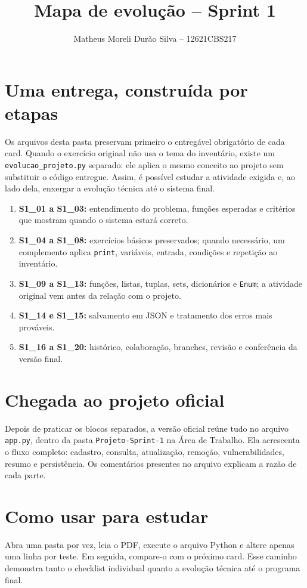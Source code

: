 \documentclass[11pt,a4paper]{article}
\title{Mapa de evolução -- Sprint 1}
\author{Matheus Moreli Durão Silva -- 12621CBS217}
\date{}
\begin{document}
\maketitle
\section*{Uma entrega, construída por etapas}
Os arquivos desta pasta preservam primeiro o entregável obrigatório de cada card. Quando o exercício original não usa o tema do inventário, existe um \texttt{evolucao\_projeto.py} separado: ele aplica o mesmo conceito ao projeto sem substituir o código entregue. Assim, é possível estudar a atividade exigida e, ao lado dela, enxergar a evolução técnica até o sistema final.

\begin{enumerate}
\item \textbf{S1\_01 a S1\_03:} entendimento do problema, funções esperadas e critérios que mostram quando o sistema estará correto.
\item \textbf{S1\_04 a S1\_08:} exercícios básicos preservados; quando necessário, um complemento aplica \texttt{print}, variáveis, entrada, condições e repetição ao inventário.
\item \textbf{S1\_09 a S1\_13:} funções, listas, tuplas, sets, dicionários e \texttt{Enum}; a atividade original vem antes da relação com o projeto.
\item \textbf{S1\_14 e S1\_15:} salvamento em JSON e tratamento dos erros mais prováveis.
\item \textbf{S1\_16 a S1\_20:} histórico, colaboração, branches, revisão e conferência da versão final.
\end{enumerate}

\section*{Chegada ao projeto oficial}
Depois de praticar os blocos separados, a versão oficial reúne tudo no arquivo \texttt{app.py}, dentro da pasta \texttt{Projeto-Sprint-1} na Área de Trabalho. Ela acrescenta o fluxo completo: cadastro, consulta, atualização, remoção, vulnerabilidades, resumo e persistência. Os comentários presentes no arquivo explicam a razão de cada parte.

\section*{Como usar para estudar}
Abra uma pasta por vez, leia o PDF, execute o arquivo Python e altere apenas uma linha por teste. Em seguida, compare-o com o próximo card. Esse caminho demonstra tanto o checklist individual quanto a evolução técnica até o programa final.
\end{document}
